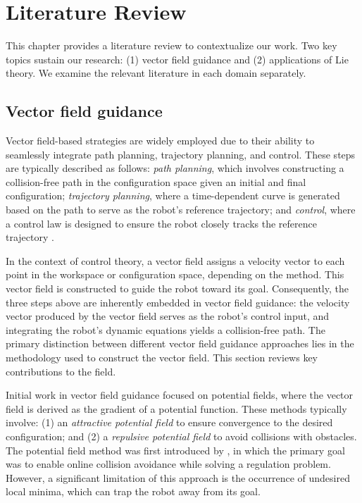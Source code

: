 \chapter{Literature Review} \label{chap:literature-review}
This chapter provides a literature review to contextualize our work. Two key topics sustain our research: (1) vector field guidance and (2) applications of Lie theory. We examine the relevant literature in each domain separately.

\section{Vector field guidance} \label{sec:lit-review-vector-field-guidance}
Vector field-based strategies are widely employed due to their ability to seamlessly integrate path planning, trajectory planning, and control. These steps are typically described as follows: \emph{path planning}, which involves constructing a collision-free path in the configuration space given an initial and final configuration; \emph{trajectory planning}, where a time-dependent curve is generated based on the path to serve as the robot's reference trajectory; and \emph{control}, where a control law is designed to ensure the robot closely tracks the reference trajectory \citep{Rimon1992}.

In the context of control theory, a vector field assigns a velocity vector to each point in the workspace or configuration space, depending on the method. This vector field is constructed to guide the robot toward its goal. Consequently, the three steps above are inherently embedded in vector field guidance: the velocity vector produced by the vector field serves as the robot's control input, and integrating the robot's dynamic equations yields a collision-free path. The primary distinction between different vector field guidance approaches lies in the methodology used to construct the vector field. This section reviews key contributions to the field.

Initial work in vector field guidance focused on potential fields, where the vector field is derived as the gradient of a potential function. These methods typically involve: (1) an \emph{attractive potential field} to ensure convergence to the desired configuration; and (2) a \emph{repulsive potential field} to avoid collisions with obstacles. The potential field method was first introduced by \citet{Khatib1985}, in which the primary goal was to enable online collision avoidance while solving a regulation problem. However, a significant limitation of this approach is the occurrence of undesired local minima, which can trap the robot away from its goal.

